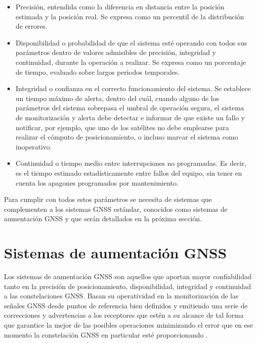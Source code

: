 \begin{itemize}
\item Precisión, entendida como la diferencia en distancia entre la posición estimada y la posición real. Se expresa como un percentil de la distribución de errores.

\item Disponibilidad o probabilidad de que el sistema esté operando con todos sus parámetros dentro de valores admisibles de precisión, integridad y continuidad, durante la operación a realizar. Se expresa como un porcentaje de tiempo, evaluado sobre largos periodos temporales.

\item Integridad o confianza en el correcto funcionamiento del sistema. Se establece un tiempo máximo de alerta, dentro del cuál, cuando alguno de los parámetros del sistema sobrepasa el umbral de operación segura, el sistema de monitorización y alerta debe detectar e informar de que existe un fallo y notificar, por ejemplo, que uno de los satélites no debe emplearse para realizar el cómputo de posicionamiento, o incluso marcar el sistema como inoperativo. %

\item Continuidad o tiempo medio entre interrupciones no programadas. Es decir, es el tiempo estimado estadísticamente entre fallos del equipo, sin tener en cuenta los apagones programados por mantenimiento.
\end{itemize}

Para cumplir con todos estos parámetros se necesita de sistemas que complementen a los sistemas GNSS estándar, conocidos como sistemas de aumentación GNSS y que serán detallados en la próxima sección.


	
\clearpage

\section{Sistemas de aumentación GNSS}
\label{sec:SistemasAumentacionGNSS}

Los sistemas de aumentación GNSS son aquellos que aportan mayor confiabilidad tanto en la precisión de posicionamiento, disponibilidad, integridad y continuidad a las constelaciones GNSS. Basan su operatividad en la monitorización de las señales GNSS desde puntos de referencia bien definidos y emitiendo una serie de correcciones y advertencias a los receptores que estén a su alcance de tal forma que garantice la mejor de las posibles operaciones minimizando el error que en ese momento la constelación GNSS en particular esté proporcionando \cite{Apuntes_SistemasGNSS}.

